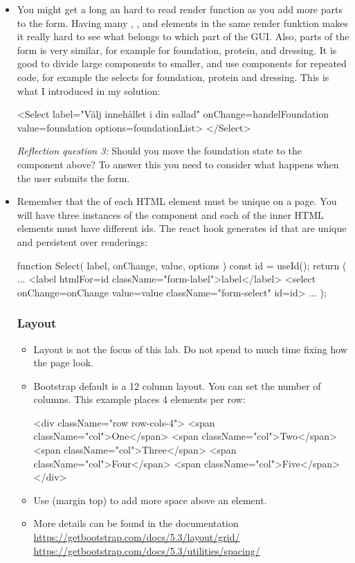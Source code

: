 \documentclass[fleqn, article, a4paper]{memoir}
\begin{document}
\begin{Assignments}
\begin{itemize}
  \item You might get a long an hard to read render function as you add more parts to the form. Having many , , and  elements in the same render funktion makes it really hard to see what belongs to which part of the GUI. Also, parts of the form is very similar, for example  for foundation, protein, and dressing. It is good to divide large components to smaller, and use components for repeated code, for example the selects for foundation, protein and dressing. This is what I introduced in my solution:
  \begin{Code}
      <Select label="Välj innehållet i din sallad"
        onChange={handelFoundation}
        value={foundation}
        options={foundationList}>
      </Select>
  \end{Code}
  \emph{Reflection question 3:} Should you move the foundation state to the  component above? To answer this you need to consider what happens when the user submits the form.

  \item Remember that the  of each HTML element must be unique on a page. You will have three instances of the  component and each of the inner  HTML elements must have different ids. The react hook  generates id that are unique and persistent over renderings:
\begin{Code}
function Select({ label, onChange, value, options }) {
  const id = useId();
  return (
    ...
    <label htmlFor={id} className="form-label">{label}</label>
    <select onChange={onChange} value={value} className="form-select" id={id}>
  ...
  );
}
\end{Code}

\subsubsection{Layout}
\begin{itemize}
\item Layout is not the focus of this lab. Do not spend to much time fixing how the page look.
\item Bootstrap default is a 12 column layout. You can set the number of columns. This example places 4 elements per row:
\begin{Code}
      <div className="row row-cols-4">
        <span className="col">One</span>
        <span className="col">Two</span>
        <span className="col">Three</span>
        <span className="col">Four</span>
        <span className="col">Five</span>
      </div>
\end{Code}
\item Use  (margin top) to add more space above an element. 
\item More details can be found in the documentation
  \\\url{https://getbootstrap.com/docs/5.3/layout/grid/}
  \\\url{https://getbootstrap.com/docs/5.3/utilities/spacing/}
\end{itemize}


\end{itemize}
\end{Assignments}
\end{document}
